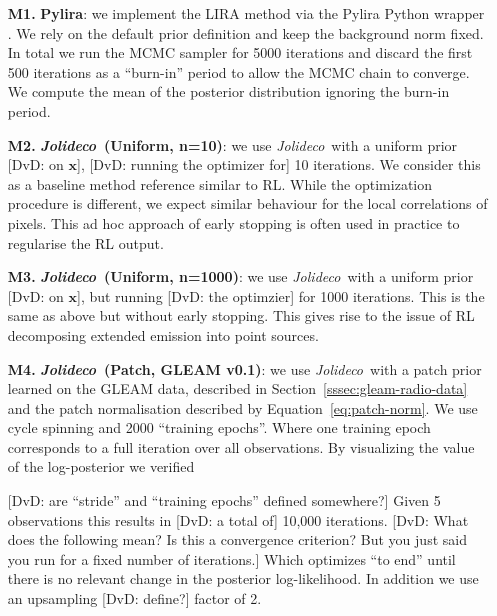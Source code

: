 \documentclass[twocolumn]{aastex631}
\newcommand{\jolideco}{\textit{Jolideco}~}
\newcommand{\dvd}[1]{{\color{red} [DvD: #1]}}
\begin{document}
    \begin{enumerate}

        \item[\bf M1.] \textbf{Pylira}: we implement the LIRA method \citep{Esch2004} via the Pylira Python wrapper \citep{Donath2022}. We rely on the default prior definition and keep the background norm fixed. In total we run the MCMC sampler for 5000 iterations and discard the first 500 iterations as a \enquote{burn-in} period to allow the MCMC chain to converge. We compute the mean of the posterior distribution ignoring the burn-in period.
        
        \item[\bf M2.] \textbf{\jolideco (Uniform, n=10)}: we use \jolideco with a uniform prior \dvd{on $\mathbf{x}$}, \dvd{running the optimizer for} 10 iterations. We consider this as a baseline method reference similar to RL. While the optimization procedure is different, we expect similar behaviour for the local correlations of pixels. This ad hoc approach of early stopping is often used in practice to regularise the RL output.
        
        \item[\bf M3.] \textbf{\jolideco (Uniform, n=1000)}:  we use \jolideco with a uniform prior \dvd{on $\mathbf{x}$}, but running \dvd{the optimzier} for 1000 iterations. This is the same as above but without early stopping. This gives rise to the issue of RL decomposing extended emission into point sources. 
        
        \item[\bf M4.] \textbf{\jolideco (Patch, GLEAM v0.1)}: we use \jolideco with a patch prior learned on the GLEAM data, described in Section~\ref{sssec:gleam-radio-data} and the patch normalisation described by Equation~\ref{eq:patch-norm}. We use cycle spinning and 2000 \enquote{training epochs}. Where one training epoch corresponds to a full iteration over all observations. By visualizing the value of the log-posterior we verified 
        
        \dvd{are ``stride'' and ``training epochs'' defined somewhere?} Given 5 observations this results in \dvd{a total of} 10,000 iterations. \dvd{What does the following mean? Is this a convergence criterion? But you just said you run for a fixed number of iterations.} Which optimizes \enquote{to end} until there is no relevant change in the posterior log-likelihood. In addition we use an upsampling \dvd{define?} factor of 2.
        

\end{enumerate}
\end{document}
